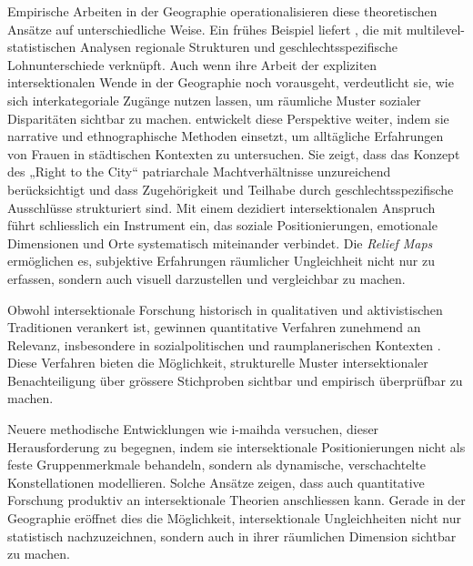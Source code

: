 Empirische Arbeiten in der Geographie operationalisieren diese theoretischen Ansätze auf unterschiedliche Weise. Ein frühes Beispiel liefert \textcite{mccallSpatialRoutesGender1998}, die mit multilevel-statistischen Analysen regionale Strukturen und geschlechtsspezifische Lohnunterschiede verknüpft. Auch wenn ihre Arbeit der expliziten intersektionalen Wende in der Geographie noch vorausgeht, verdeutlicht sie, wie sich interkategoriale Zugänge nutzen lassen, um räumliche Muster sozialer Disparitäten sichtbar zu machen. \textcite{fensterRightGenderedCity2005} entwickelt diese Perspektive weiter, indem sie narrative und ethnographische Methoden einsetzt, um alltägliche Erfahrungen von Frauen in städtischen Kontexten zu untersuchen. Sie zeigt, dass das Konzept des „Right to the City“ patriarchale Machtverhältnisse unzureichend berücksichtigt und dass Zugehörigkeit und Teilhabe durch geschlechtsspezifische Ausschlüsse strukturiert sind. Mit einem dezidiert intersektionalen Anspruch führt \textcite{rodo-de-zarateDevelopingGeographiesIntersectionality2014} schliesslich ein Instrument ein, das soziale Positionierungen, emotionale Dimensionen und Orte systematisch miteinander verbindet. Die \emph{Relief Maps} ermöglichen es, subjektive Erfahrungen räumlicher Ungleichheit nicht nur zu erfassen, sondern auch visuell darzustellen und vergleichbar zu machen.

\vspace{2em}

Obwohl intersektionale Forschung historisch in qualitativen und aktivistischen Traditionen verankert ist, gewinnen quantitative Verfahren zunehmend an Relevanz, insbesondere in sozialpolitischen und raumplanerischen Kontexten \parencite{bauerIntersectionalityQuantitativeResearch2021}. Diese Verfahren bieten die Möglichkeit, strukturelle Muster intersektionaler Benachteiligung über grössere Stichproben sichtbar und empirisch überprüfbar zu machen.

Neuere methodische Entwicklungen wie \gls{i-maihda} \parencite[\gls{ua}][]{evansMultilevelApproachModeling2018,bellExtendingIntersectionalMultilevel2023} versuchen, dieser Herausforderung zu begegnen, indem sie intersektionale Positionierungen nicht als feste Gruppenmerkmale behandeln, sondern als dynamische, verschachtelte Konstellationen modellieren. Solche Ansätze zeigen, dass auch quantitative Forschung produktiv an intersektionale Theorien anschliessen kann. Gerade in der Geographie eröffnet dies die Möglichkeit, intersektionale Ungleichheiten nicht nur statistisch nachzuzeichnen, sondern auch in ihrer räumlichen Dimension sichtbar zu machen.

